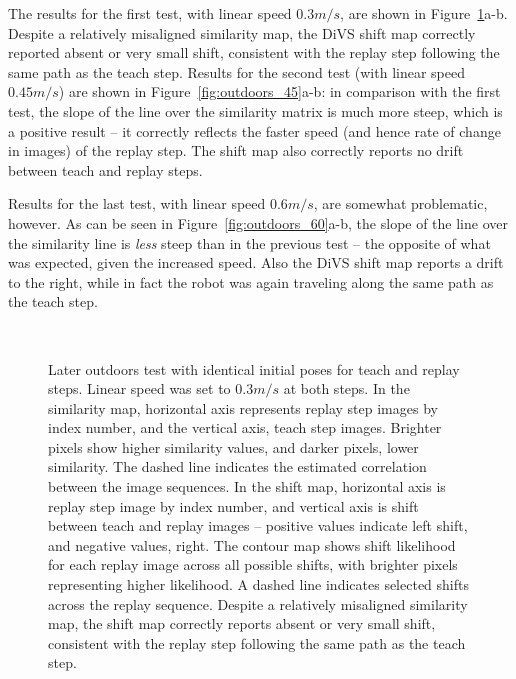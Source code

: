 \documentclass[twocolumn, 9pt,fleqn]{jsproceedings}
\begin{document}
The results for the first test, with linear speed $0.3m/s$, are shown in Figure~\ref{fig:outdoors_30}a-b. Despite a relatively misaligned similarity map, the DiVS shift map correctly reported absent or very small shift, consistent with the replay step following the same path as the teach step. Results for the second test (with linear speed $0.45m/s$) are shown in Figure~\ref{fig:outdoors_45}a-b: in comparison with the first test, the slope of the line over the similarity matrix is much more steep, which is a positive result -- it correctly reflects the faster speed (and hence rate of change in images) of the replay step. The shift map also correctly reports no drift between teach and replay steps.

Results for the last test, with linear speed $0.6m/s$, are somewhat problematic, however. As can be seen in Figure~\ref{fig:outdoors_60}a-b, the slope of the line over the similarity line is \textit{less} steep than in the previous test -- the opposite of what was expected, given the increased speed. Also the DiVS shift map reports a drift to the right, while in fact the robot was again traveling along the same path as the teach step.

\begin{figure}[t]
\\
\caption{Later outdoors test with identical initial poses for teach and replay steps. Linear speed was set to $0.3m/s$ at both steps. In the similarity map, horizontal axis represents replay step images by index number, and the vertical axis, teach step images. Brighter pixels show higher similarity values, and darker pixels, lower similarity. The dashed line indicates the estimated correlation between the image sequences. In the shift map, horizontal axis is replay step image by index number, and vertical axis is shift between teach and replay images -- positive values indicate left shift, and negative values, right. The contour map shows shift likelihood for each replay image across all possible shifts, with brighter pixels representing higher likelihood. A dashed line indicates selected shifts across the replay sequence. Despite a relatively misaligned similarity map, the shift map correctly reports absent or very small shift, consistent with the replay step following the same path as the teach step.}
\label{fig:outdoors_30}
\end{figure}
\end{document}
